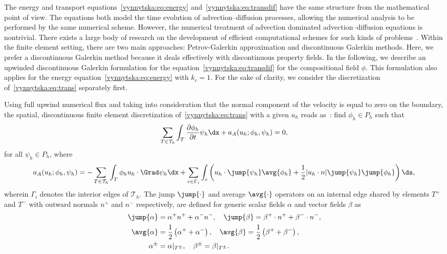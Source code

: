 The energy and transport equations~\eqref{vynnytska:eq:energy}
and~\eqref{vynnytska:eq:transdif} have the same structure from the
mathematical point of view. The equations both model the time
evolution of advection--diffusion processes, allowing the numerical
analysis to be performed by the same numerical scheme. However, the
numerical treatment of advection dominated advection--diffusion
equations is nontrivial. There exists a large body of research on the
development of efficient computational schemes for such kinds of
problems~\citep{Lin2006, ZienkiewiczTaylor2000}.  Within the finite
element setting, there are two main approaches: Petrov-Galerkin
approximation and discontinuous Galerkin methods. Here, we prefer a
discontinuous Galerkin method because it deals effectively with
discontinuous property fields. In the following, we describe an
upwinded discontinuous Galerkin formulation for the
equation~\eqref{vynnytska:eq:transdif} for the compositional field
$\phi$. This formulation also applies for the energy
equation~\eqref{vynnytska:eq:energy} with $k_c = 1$. For the sake of
clarity, we consider the discretization of~\eqref{vynnytska:eq:trans}
separately first.

Using full upwind numerical flux and taking into consideration that
the normal component of the velocity is equal to zero on the boundary, the
spatial, discontinuous finite element discretization
of~\eqref{vynnytska:eq:trans} with a given $u_h$ reads
as~\citep{PietroLoForteParolini2006}: find $\phi_h \in P_h$ such that
\begin{equation}
  \sum_{T \in \mathcal{T}_h} \int_T \frac{\partial \phi_h}{\partial t} \psi_h
  \dx + a_{A} (u_h; \phi_h, \psi_h) = 0,
\end{equation}
for all $\psi_h \in P_h$, where
\begin{equation}
  \label{vynnytska:eq:dgadv}
   a_{A} (u_h; \phi_h, \psi_h )
   =
   - \sum_{T \in \mathcal{T}_h} \int_T \phi_h u_h \cdot \Grad \psi_h \dx
   + \sum_{e \in \Gamma_i} \int_{e} \left (
   u_h \cdot \jump{\psi_h} \avg{\phi_h} + \frac{1}{2}
   | u_h \cdot n | \jump{\psi_h} \jump{\phi_h} \right ) \ds,
\end{equation}
wherein $\Gamma_i$ denotes the interior edges of $\mathcal{T}_h$. The
jump $\jump{\cdot}$ and average $\avg{\cdot}$ operators on an internal
edge shared by elements $T^{+}$ and $T^{-}$ with outward normals $n^+$
and $n^-$ respectively, are defined for generic scalar fields $\alpha$
and vector fields $\beta$ as
\begin{align}
  \jump{\alpha}&= \alpha^{+} n^{+} + \alpha^{-} n^{-}, \quad
  \jump{\beta}  = \beta^{+} \cdot n^{+} + \beta^{-} \cdot n^{-}, \\
  \avg{\alpha} &= \frac{1}{2} \left( \alpha^{+} + \alpha^{-} \right), \quad
  \avg{\beta}   = \frac{1}{2} \left( \beta^{+} + \beta^{-} \right), \\
  \alpha^{\pm}  &= \alpha |_{T^{\pm}}, \quad
  \beta^{\pm}    = \beta |_{T^{\pm}}.
\end{align}

